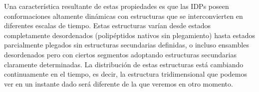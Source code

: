 Una característica resultante de estas propiedades es que las IDPs poseen conformaciones altamente dinámicas con estructuras que se interconvierten en diferentes escalas de tiempo. 
Estas estructuras varían desde estados completamente desordenados (polipéptidos nativos sin plegamiento) hasta estados parcialmente plegados sin estructuras secundarias definidas, 
o incluso ensambles desordenados pero con ciertos segmentos adoptando estructuras secundarias claramente determinadas.
La distribución de estas estructuras está cambiando continuamente en el tiempo, es decir, la estructura tridimensional que podemos ver en un instante dado será diferente de la que veremos en otro momento.




